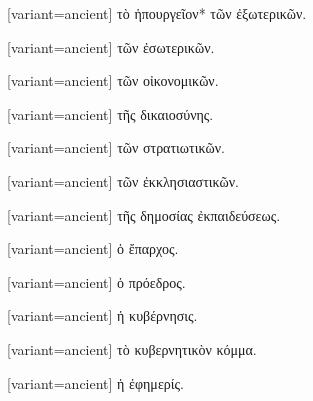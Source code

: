 \switchcolumn*
{}%
\switchcolumn
\begin{greek}[variant=ancient]%
τὸ ἡπουργεῖον{*} τῶν ἐξωτερικῶν.%
\end{greek}%
\switchcolumn*
{}%
\switchcolumn
\begin{greek}[variant=ancient]%
\qquad{}\textgreek{τῶν ἐσωτερικῶν.}%
\end{greek}%
\switchcolumn*
{}%
\switchcolumn
\begin{greek}[variant=ancient]%
\qquad{}\textgreek{τῶν οἰκονομικῶν.}%
\end{greek}%
\switchcolumn*
{}%
\switchcolumn
\begin{greek}[variant=ancient]%
\qquad{}\textgreek{τῆς δικαιοσύνης.}%
\end{greek}%
\switchcolumn*
{}%
\switchcolumn
\begin{greek}[variant=ancient]%
\qquad{}\textgreek{τῶν στρατιωτικῶν.}%
\end{greek}%
\switchcolumn*
{}%
\switchcolumn
\begin{greek}[variant=ancient]%
\qquad{}\textgreek{τῶν ἐκκλησιαστικῶν.}%
\end{greek}%
\switchcolumn*
{}%
\switchcolumn
\begin{greek}[variant=ancient]%
\qquad{}\textgreek{τῆς δημοσίας ἐκπαιδεύσεως.}%
\end{greek}%
\switchcolumn*
{}%
\switchcolumn
\begin{greek}[variant=ancient]%
ὁ ἔπαρχος.%
\end{greek}%
\switchcolumn*
{}%
\switchcolumn
\begin{greek}[variant=ancient]%
ὁ πρόεδρος.%
\end{greek}%
\switchcolumn*
{}%
\switchcolumn
\begin{greek}[variant=ancient]%
ἡ κυβέρνησις.%
\end{greek}%
\switchcolumn*
{}%
\switchcolumn
\begin{greek}[variant=ancient]%
τὸ κυβερνητικὸν κόμμα.%
\end{greek}%
\switchcolumn*
{}%
\switchcolumn
\begin{greek}[variant=ancient]%
ἡ ἐφημερίς.%
\end{greek}%
